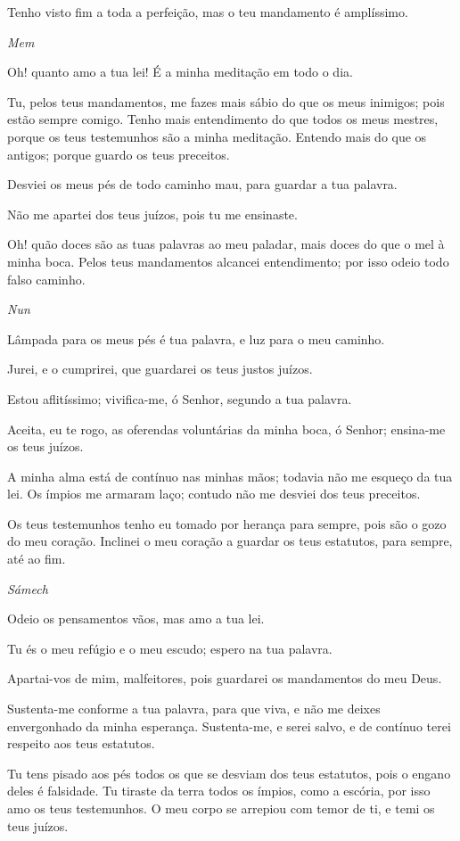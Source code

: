 Tenho visto fim a toda a perfeição, mas o teu mandamento é
amplíssimo.

\bigskip
\centerline{\emph{Mem}}

Oh! quanto amo a tua lei! É a minha meditação em todo o dia.

Tu, pelos teus mandamentos, me fazes mais sábio do que os meus
inimigos; pois estão sempre comigo. Tenho mais entendimento
do que todos os meus mestres, porque os teus testemunhos são a minha
meditação. Entendo mais do que os antigos; porque guardo os
teus preceitos.

Desviei os meus pés de todo caminho mau, para guardar a tua
palavra.

Não me apartei dos teus juízos, pois tu me ensinaste.

Oh! quão doces são as tuas palavras ao meu paladar, mais doces
do que o mel à minha boca. Pelos teus mandamentos alcancei
entendimento; por isso odeio todo falso caminho.

\bigskip
\centerline{\emph{Nun}}

Lâmpada para os meus pés é tua palavra, e luz para o meu
caminho.

Jurei, e o cumprirei, que guardarei os teus justos juízos.

Estou aflitíssimo; vivifica-me, ó Senhor, segundo a tua palavra.

Aceita, eu te rogo, as oferendas voluntárias da minha boca, ó
Senhor; ensina-me os teus juízos.

A minha alma está de contínuo nas minhas mãos; todavia não me
esqueço da tua lei. Os ímpios me armaram laço; contudo não
me desviei dos teus preceitos.

Os teus testemunhos tenho eu tomado por herança para sempre,
pois são o gozo do meu coração. Inclinei o meu coração a
guardar os teus estatutos, para sempre, até ao fim.

\bigskip
\centerline{\emph{Sámech}}

Odeio os pensamentos vãos, mas amo a tua lei.

Tu és o meu refúgio e o meu escudo; espero na tua palavra.

Apartai-vos de mim, malfeitores, pois guardarei os mandamentos
do meu Deus.

Sustenta-me conforme a tua palavra, para que viva, e não me
deixes envergonhado da minha esperança. Sustenta-me, e serei
salvo, e de contínuo terei respeito aos teus estatutos.

Tu tens pisado aos pés todos os que se desviam dos teus
estatutos, pois o engano deles é falsidade. Tu tiraste da
terra todos os ímpios, como a escória, por isso amo os teus
testemunhos. O meu corpo se arrepiou com temor de ti, e temi
os teus juízos.

